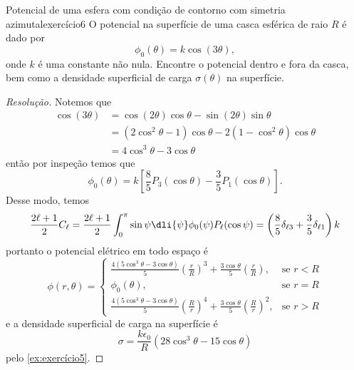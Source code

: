 \begin{exercício}{Potencial de uma esfera com condição de contorno com simetria azimutal}{exercício6}
    O potencial na superfície de uma casca esférica de raio \(R\) é dado por
    \begin{equation*}
        \phi_0(\theta) = k \cos(3\theta),
    \end{equation*}
    onde \(k\) é uma constante não nula. Encontre o potencial dentro e fora da casca, bem como a densidade superficial de carga \(\sigma(\theta)\) na superfície.
\end{exercício}
\begin{proof}[Resolução]
    Notemos que
    \begin{align*}
        \cos(3\theta) &= \cos(2\theta)\cos\theta - \sin(2\theta) \sin\theta\\&= (2\cos^2\theta - 1)\cos\theta - 2(1 - \cos^2\theta)\cos\theta \\&= 4\cos^3\theta - 3\cos\theta
    \end{align*}
    então por inspeção temos que
    \begin{equation*}
        \phi_0(\theta) = k\left[\frac85P_3(\cos\theta) - \frac35 P_1(\cos\theta)\right].
    \end{equation*}
    Desse modo, temos
    \begin{equation*}
        \frac{2 \ell + 1}{2}C_\ell = \frac{2\ell + 1}{2}\int_0^\pi \sin\psi \dli{\psi} \phi_0(\psi) P_\ell(\cos\psi) = \left(\frac{8}{5}\delta_{\ell 3} + \frac{3}{5}\delta_{\ell 1}\right)k
    \end{equation*}
    portanto o potencial elétrico em todo espaço é
    \begin{equation*}
        \phi(r, \theta) = \begin{cases}
            \frac{4(5 \cos^3\theta - 3 \cos\theta)}{5}\left(\frac{r}{R}\right)^3 + \frac{3\cos\theta}{5}\left(\frac{r}{R}\right), &\text{se } r < R\\
            \phi_0(\theta), &\text{se } r = R\\
            \frac{4(5 \cos^3\theta - 3 \cos\theta)}{5}\left(\frac{R}{r}\right)^4 + \frac{3\cos\theta}{5}\left(\frac{R}{r}\right)^2, &\text{se } r > R
        \end{cases}
    \end{equation*}
    e a densidade superficial de carga na superfície é
    \begin{equation*}
        \sigma = \frac{k\epsilon_0}{R} \left(28 \cos^3\theta -  15\cos\theta\right)
    \end{equation*}
    pelo \cref{ex:exercício5}.
\end{proof}
